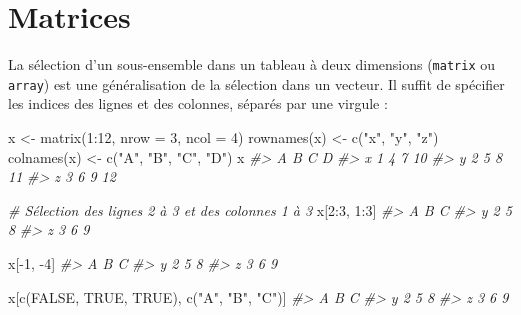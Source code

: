 \documentclass[
  french,
]{scrbook}
\newenvironment{Shaded}{\begin{snugshade}}{\end{snugshade}}
\newcommand{\AttributeTok}[1]{\textcolor[rgb]{0.77,0.63,0.00}{#1}}
\newcommand{\CommentTok}[1]{\textcolor[rgb]{0.56,0.35,0.01}{\textit{#1}}}
\newcommand{\ConstantTok}[1]{\textcolor[rgb]{0.00,0.00,0.00}{#1}}
\newcommand{\DecValTok}[1]{\textcolor[rgb]{0.00,0.00,0.81}{#1}}
\newcommand{\FunctionTok}[1]{\textcolor[rgb]{0.00,0.00,0.00}{#1}}
\newcommand{\NormalTok}[1]{#1}
\newcommand{\OtherTok}[1]{\textcolor[rgb]{0.56,0.35,0.01}{#1}}
\newcommand{\SpecialCharTok}[1]{\textcolor[rgb]{0.00,0.00,0.00}{#1}}
\newcommand{\StringTok}[1]{\textcolor[rgb]{0.31,0.60,0.02}{#1}}
\begin{document}
\hypertarget{subset-matrix}{%
\section{Matrices}\label{subset-matrix}}

La sélection d'un sous-ensemble dans un tableau à deux dimensions (\texttt{matrix} ou \texttt{array}) est une généralisation de la sélection dans un vecteur. Il suffit de spécifier les indices des lignes et des colonnes, séparés par une virgule :

\begin{Shaded}
\begin{Highlighting}[]
\NormalTok{x }\OtherTok{\textless{}{-}} \FunctionTok{matrix}\NormalTok{(}\DecValTok{1}\SpecialCharTok{:}\DecValTok{12}\NormalTok{, }\AttributeTok{nrow =} \DecValTok{3}\NormalTok{, }\AttributeTok{ncol =} \DecValTok{4}\NormalTok{)}
\FunctionTok{rownames}\NormalTok{(x) }\OtherTok{\textless{}{-}} \FunctionTok{c}\NormalTok{(}\StringTok{"x"}\NormalTok{, }\StringTok{"y"}\NormalTok{, }\StringTok{"z"}\NormalTok{)}
\FunctionTok{colnames}\NormalTok{(x) }\OtherTok{\textless{}{-}} \FunctionTok{c}\NormalTok{(}\StringTok{"A"}\NormalTok{, }\StringTok{"B"}\NormalTok{, }\StringTok{"C"}\NormalTok{, }\StringTok{"D"}\NormalTok{)}
\NormalTok{x}
\CommentTok{\#\textgreater{}   A B C  D}
\CommentTok{\#\textgreater{} x 1 4 7 10}
\CommentTok{\#\textgreater{} y 2 5 8 11}
\CommentTok{\#\textgreater{} z 3 6 9 12}

\CommentTok{\# Sélection des lignes 2 à 3 et des colonnes 1 à 3}
\NormalTok{x[}\DecValTok{2}\SpecialCharTok{:}\DecValTok{3}\NormalTok{, }\DecValTok{1}\SpecialCharTok{:}\DecValTok{3}\NormalTok{]}
\CommentTok{\#\textgreater{}   A B C}
\CommentTok{\#\textgreater{} y 2 5 8}
\CommentTok{\#\textgreater{} z 3 6 9}

\NormalTok{x[}\SpecialCharTok{{-}}\DecValTok{1}\NormalTok{, }\SpecialCharTok{{-}}\DecValTok{4}\NormalTok{]}
\CommentTok{\#\textgreater{}   A B C}
\CommentTok{\#\textgreater{} y 2 5 8}
\CommentTok{\#\textgreater{} z 3 6 9}

\NormalTok{x[}\FunctionTok{c}\NormalTok{(}\ConstantTok{FALSE}\NormalTok{, }\ConstantTok{TRUE}\NormalTok{, }\ConstantTok{TRUE}\NormalTok{), }\FunctionTok{c}\NormalTok{(}\StringTok{"A"}\NormalTok{, }\StringTok{"B"}\NormalTok{, }\StringTok{"C"}\NormalTok{)]}
\CommentTok{\#\textgreater{}   A B C}
\CommentTok{\#\textgreater{} y 2 5 8}
\CommentTok{\#\textgreater{} z 3 6 9}
\end{Highlighting}
\end{Shaded}
\end{document}
